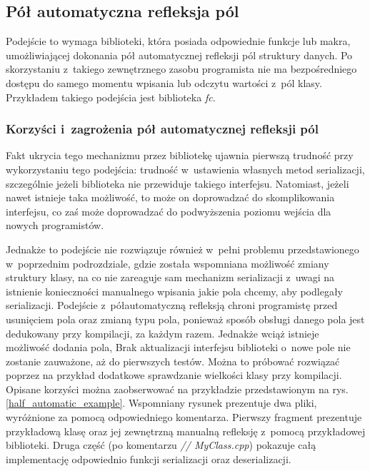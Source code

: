 \documentclass[12pt]{article}
\newcommand{\n}{\newline}
\newcommand{\nonpl}[1]{{\it #1}}
\newcommand{\code}[1]{{\it #1}}
\begin{document}
{		{
			\subsection{Pół automatyczna refleksja pól}

			Podejście to wymaga biblioteki, która posiada odpowiednie funkcje lub makra, umożliwiającej dokonania pół automatycznej
			refleksji pól struktury danych. Po skorzystaniu z~takiego zewnętrznego zasobu programista nie ma bezpośredniego dostępu do samego momentu
			wpisania lub odczytu wartości z~pól klasy. Przykładem takiego podejścia jest biblioteka \nonpl{fc}\cite{fc_repo}.\n

			{
				\subsubsection{Korzyści i~zagrożenia pół automatycznej refleksji pól}

				Fakt ukrycia tego mechanizmu przez bibliotekę ujawnia pierwszą trudność przy wykorzystaniu tego podejścia: trudność w~ustawienia własnych
				metod serializacji, szczególnie jeżeli biblioteka nie przewiduje takiego interfejsu. Natomiast, jeżeli nawet istnieje taka możliwość,
				to może on doprowadzać do skomplikowania interfejsu, co zaś może doprowadzać do podwyższenia poziomu wejścia dla nowych programistów.\n

				Jednakże to podejście nie rozwiązuje również w~pełni problemu przedstawionego w~poprzednim podrozdziale, gdzie została wspomniana
				możliwość zmiany struktury klasy, na co nie zareaguje sam mechanizm serializacji z~uwagi na istnienie
				konieczności manualnego wpisania jakie pola chcemy, aby podlegały serializacji. Podejście z~półautomatyczną refleksją
				chroni programistę przed usunięciem pola oraz zmianą typu pola, ponieważ sposób obsługi danego pola jest dedukowany przy
				kompilacji, za każdym razem. Jednakże wciąż istnieje możliwość dodania pola, Brak aktualizacji interfejsu biblioteki o~nowe pole nie zostanie zauważone,
				aż do pierwszych testów. Można to próbować rozwiązać poprzez na przykład dodatkowe sprawdzanie wielkości klasy przy kompilacji.
				Opisane korzyści można zaobserwować na przykładzie przedstawionym na rys. \ref{half_automatic_example}. Wspomniany
				rysunek prezentuje dwa pliki, wyróżnione za pomocą odpowiedniego komentarza. Pierwszy fragment prezentuje przykładową klasę oraz
				jej zewnętrzną manualną refleksję z~pomocą przykładowej biblioteki. Druga część (po komentarzu \code{// MyClass.cpp}) pokazuje
				całą implementację odpowiednio funkcji serializacji oraz deserializacji.\n

}}}
\end{document}
